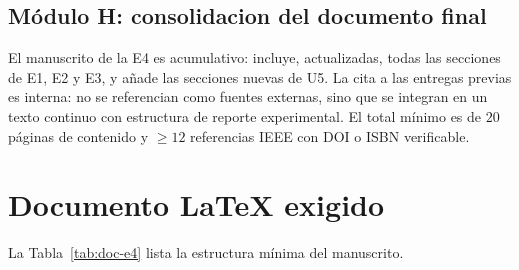 \documentclass[11pt,a4paper]{article}
\begin{document}
\subsection{Módulo H: consolidacion del documento final}

    El manuscrito de la E4 es acumulativo: incluye, actualizadas, todas las secciones de E1, E2 y E3, y añade las secciones nuevas de U5. La cita a las entregas previas es interna: no se referencian como fuentes externas, sino que se integran en un texto continuo con estructura de reporte experimental. El total mínimo es de $20$ páginas de contenido y $\ge 12$ referencias IEEE con DOI o ISBN verificable.

\section{Documento LaTeX exigido}

    La Tabla~\ref{tab:doc-e4} lista la estructura mínima del manuscrito.
\end{document}
